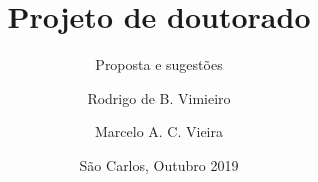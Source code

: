 \documentclass{beamer}
\title[rodrigo.vimieiro@usp.br] %
{Projeto de doutorado}
\subtitle{Proposta e sugestões}
\author[Vimieiro, Rodrigo] %
{Rodrigo de B. Vimieiro\inst{1} \and Marcelo A. C. Vieira\inst{1}}
\institute[USP] %
{
	\inst{1}%
	Universidade de São Paulo\\
	Escola de Engenharia de São Carlos\\
	Programa de Pós-Graduação em Engenharia Elétrica\\



\begin{tikzpicture}[remember picture,overlay]
\node[anchor=north east,yshift=2pt] at (current page.north east) {\texttt{[image: figures/logo/logo\_eesc.png]}};
\end{tikzpicture}

\begin{tikzpicture}[remember picture,overlay]
\node[anchor=north west,yshift=2pt] at (current page.north west) {\texttt{[image: figures/logo/logo\_lavi.png]}};
\end{tikzpicture}

}
\date[São Carlos 2019] %
{São Carlos, Outubro 2019}
\begin{document}
 
\frame{\titlepage}







\end{document}
